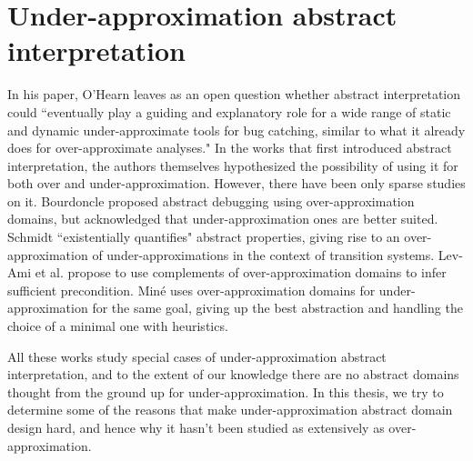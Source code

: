 \section{Under-approximation abstract interpretation}
In his paper, O'Hearn leaves as an open question whether abstract interpretation could ``eventually play a guiding and explanatory role for a wide range of static and dynamic under-approximate tools for bug catching, similar to what it already does for over-approximate analyses."
In the works that first introduced abstract interpretation, the authors themselves hypothesized the possibility of using it for both over and under-approximation. However, there have been only sparse studies on it.
Bourdoncle \cite{bourdoncle-abs-debugging} proposed abstract debugging using over-approximation domains, but acknowledged that under-approximation ones are better suited.
Schmidt \cite{schmidt-higher-order-approx-2007} ``existentially quantifies" abstract properties, giving rise to an over-approximation of under-approximations in the context of transition systems.
Lev-Ami et al. \cite{lev-backward-analysis-complement} propose to use complements of over-approximation domains to infer sufficient precondition.
Miné \cite{mine-backward-underapprox-14} uses over-approximation domains for under-approximation for the same goal, giving up the best abstraction and handling the choice of a minimal one with heuristics.

All these works study special cases of under-approximation abstract interpretation, and to the extent of our knowledge there are no abstract domains thought from the ground up for under-approximation. In this thesis, we try to determine some of the reasons that make under-approximation abstract domain design hard, and hence why it hasn't been studied as extensively as over-approximation.

